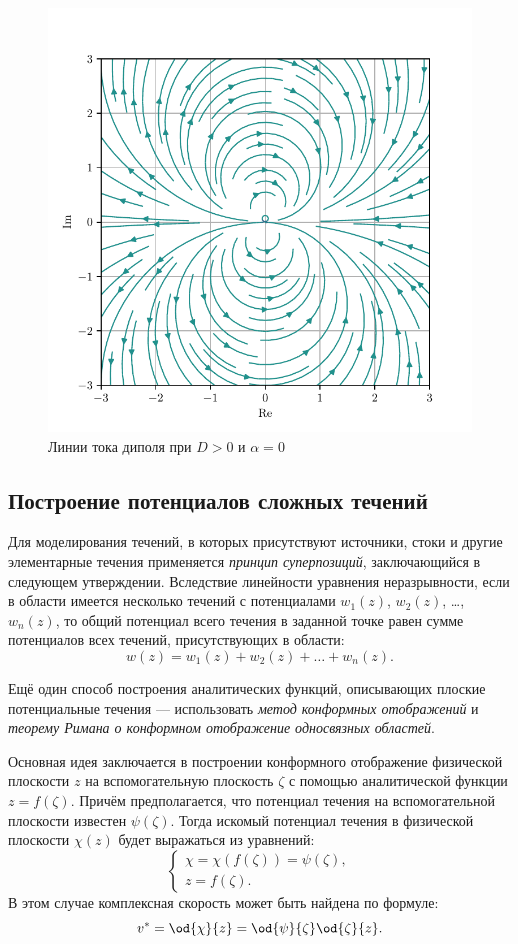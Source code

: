 \documentclass[14pt]{extarticle}
\begin{document}
\begin{problems}
\begin{figure}
	\centering
	\includegraphics[width=0.45\linewidth]{../img/dipol.pdf}
	\caption{Линии тока диполя при $D>0$ и $\alpha = 0$}
	\label{fig:dipol}
\end{figure}
\end{problems}

\subsection{Построение потенциалов сложных течений}

Для моделирования течений, в которых присутствуют источники, стоки и другие элементарные течения применяется \textit{принцип суперпозиций}, заключающийся в следующем утверждении. Вследствие линейности уравнения неразрывности, если в области имеется несколько течений с потенциалами $w_1(z)$, $w_2(z)$, \ldots , $w_n(z)$, то общий потенциал всего течения в заданной точке равен сумме потенциалов всех течений, присутствующих в области:
\[
w(z) = w_1(z) + w_2(z) + \ldots + w_n(z).
\] 


Ещё один способ построения аналитических функций, описывающих плоские потенциальные течения ---  использовать \textit{метод конформных отображений} и \textit{теорему Римана о конформном отображение односвязных областей}. 

Основная идея заключается в построении конформного отображение физической плоскости $z$  на вспомогательную плоскость $\zeta$  с помощью аналитической функции $z=f(\zeta)$. Причём предполагается, что потенциал течения на вспомогательной плоскости известен $\psi(\zeta)$. Тогда искомый потенциал течения в физической плоскости  $\chi(z)$ будет выражаться из уравнений:
\[
\left\{
\begin{array}{l}
	\chi = \chi(f(\zeta)) = \psi(\zeta),\\
	z = f(\zeta).
\end{array}
\right.
\]
В этом случае комплексная скорость может быть найдена по формуле:
\[
v^* = \od{\chi}{z} = \od{\psi}{\zeta}  \od{\zeta}{z}.
\]
\end{document}
